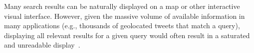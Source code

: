 Many search results can be naturally displayed on a map or other interactive visual interface.  However, given the massive volume of available information in many applications (e.g., thousands of geolocated tweets that match a query), displaying all relevant results for a given query would often result in a saturated and unreadable display~\cite{Landesberger2011,Liu2014,Sun2013}.





